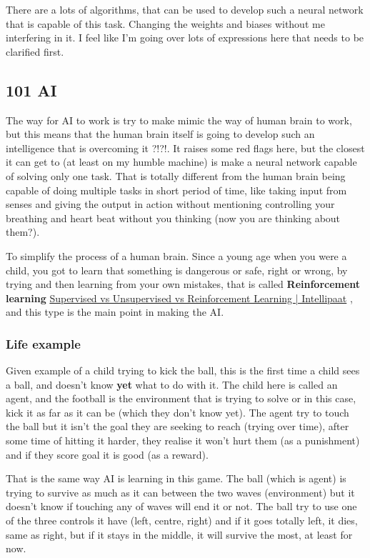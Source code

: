 There are a lots of algorithms, that can be used to develop such a neural network that is capable of this task. Changing the weights and biases without me interfering in it. I feel like I'm going over lots of expressions here that needs to be clarified first.

\subsection{101 AI}\label{101-ai}
The way for AI to work is try to make mimic the way of human brain to work, but this means that the human brain itself is going to develop such an intelligence that is overcoming it ?!?!. It raises some red flags here, but the closest it can get to (at least on my humble machine) is make a neural network capable of solving only one task. That is totally different from the human brain being capable of doing multiple tasks in short period of time, like taking input from senses and giving the output in action without mentioning controlling your breathing and heart beat without you thinking (now you are thinking about them?).

To simplify the process of a human brain. Since a young age when you were a child, you got to learn that something is dangerous or safe, right or wrong, by trying and then learning from your own mistakes, that is called \textbf{Reinforcement learning} \href{https://intellipaat.com/blog/supervised-learning-vs-unsupervised-learning-vs-reinforcement-learning/}{Supervised vs Unsupervised vs Reinforcement Learning | Intellipaat} , and this type is the main point in making the AI.

\subsubsection{Life example}\label{sec:ai-life-example}
Given example of a child trying to kick the ball, this is the first time a child sees a ball, and doesn't know \textbf{yet} what to do with it. The child here is called an agent, and the football is the environment that is trying to solve or in this case, kick it as far as it can be (which they don't know yet). The agent try to touch the ball but it isn't the goal they are seeking to reach (trying over time), after some time of hitting it harder, they realise it won't hurt them (as a punishment) and if they score goal it is good (as a reward). 

That is the same way AI is learning in this game. The ball (which is agent) is trying to survive as much as it can between the two waves (environment) but it doesn't know if touching any of waves will end it or not. The ball try to use one of the three controls it have (left, centre, right) and if it goes totally left, it dies, same as right, but if it stays in the middle, it will survive the most, at least for now.

